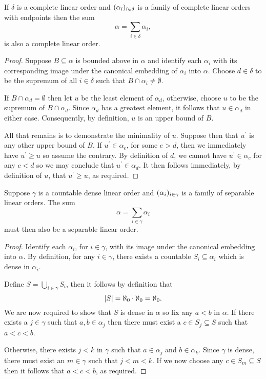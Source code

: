 \begin{prp}\label{prp:csums}
	If $\delta$ is a complete linear order and $(\alpha_i)_{i\in\delta}$
	is a family of complete linear orders with endpoints then the sum
	\begin{equation}
		\alpha=\sum_{i\in\delta}\alpha_i,
	\end{equation}
	is also a complete linear order.
\end{prp}
\begin{proof}
	Suppose $B\subseteq\alpha$ is bounded above in $\alpha$ and identify each
	$\alpha_{i}$ with its corresponding image under the canonical embedding of
	$\alpha_{i}$ into $\alpha$. Choose $d\in\delta$ to be the supremum of
	all $i\in\delta$ such that $B\cap\alpha_{i}\neq\emptyset$.

	If $B\cap\alpha_{d}=\emptyset$ then let $u$ be the least element of
	$\alpha_{d}$, otherwise, choose $u$ to be the supremum of $B\cap\alpha_{d}$.
	Since $\alpha_{d}$ has a greatest element, it follows that $u\in\alpha_{d}$
	in either case.  Consequently, by definition, $u$ is an upper bound of $B$.

	All that remains is to demonstrate the minimality of $u$.  Suppose then that
	$u^{\prime}$ is any other upper bound of $B$.  If $u^{\prime}\in\alpha_{e}$,
	for some $e>d$, then we immediately have $u^{\prime}\geq u$ so assume the
	contrary.  By definition of $d$, we cannot have $u^{\prime}\in\alpha_{c}$
	for any $c<d$ so we may conclude that $u^{\prime}\in\alpha_{d}$.  It then
	follows immediately, by definition of $u$, that $u^{\prime}\geq u$, as required.
\end{proof}

\begin{prp}\label{prp:countdensumsep}
	Suppose $\gamma$ is a countable dense linear order and
	$(\alpha_{i})_{i\in\gamma}$ is a family of separable linear orders.
	The sum
	\begin{equation}
		\alpha=\sum_{i\in\gamma}\alpha_{i}
	\end{equation}
	must then also be a separable linear order.
\end{prp}
\begin{proof}
	Identify each $\alpha_{i}$, for $i\in\gamma$, with its image under the
	canonical embedding into $\alpha$.  By definition, for any $i\in\gamma$,
	there exists a countable $S_{i}\subseteq\alpha_{i}$ which is dense in
	$\alpha_{i}$.

	Define $S=\bigcup_{i\in\gamma}S_{i}$, then it follows by definition that
	\begin{equation}
		\left\lvert S\right\rvert= \aleph_0\cdot\aleph_0=\aleph_0.
	\end{equation}
	We are now required to show that $S$ is dense in $\alpha$ so fix any $a<b$
	in $\alpha$.  If there exists a $j\in\gamma$ such that $a,b\in\alpha_{j}$
	then there must exist a $c\in S_{j}\subseteq S$ such that $a<c<b$.

	Otherwise, there exists $j<k$ in $\gamma$ such that $a\in\alpha_{j}$ and
	$b\in\alpha_{k}$.  Since $\gamma$ is dense, there must exist an $m\in\gamma$
	such that $j<m<k$.  If we now choose any $c\in S_{m}\subseteq S$ then it
	follows that $a<c<b$, as required.
\end{proof}

